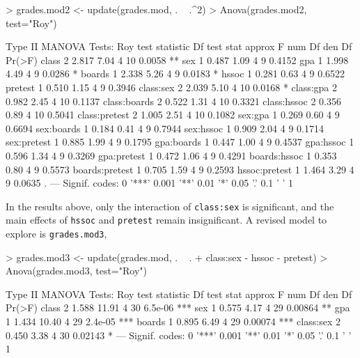 \documentclass[11pt]{article}
\newcommand{\code}[1]{{\texttt{#1}}}
\begin{document}
\begin{Schunk}
\begin{Sinput}
> grades.mod2 <- update(grades.mod, . ~ .^2)
> Anova(grades.mod2, test="Roy")
\end{Sinput}
\begin{Soutput}
Type II MANOVA Tests: Roy test statistic
               Df test stat approx F num Df den Df Pr(>F)   
class           2     2.817     7.04      4     10 0.0058 **
sex             1     0.487     1.09      4      9 0.4152   
gpa             1     1.998     4.49      4      9 0.0286 * 
boards          1     2.338     5.26      4      9 0.0183 * 
hssoc           1     0.281     0.63      4      9 0.6522   
pretest         1     0.510     1.15      4      9 0.3946   
class:sex       2     2.039     5.10      4     10 0.0168 * 
class:gpa       2     0.982     2.45      4     10 0.1137   
class:boards    2     0.522     1.31      4     10 0.3321   
class:hssoc     2     0.356     0.89      4     10 0.5041   
class:pretest   2     1.005     2.51      4     10 0.1082   
sex:gpa         1     0.269     0.60      4      9 0.6694   
sex:boards      1     0.184     0.41      4      9 0.7944   
sex:hssoc       1     0.909     2.04      4      9 0.1714   
sex:pretest     1     0.885     1.99      4      9 0.1795   
gpa:boards      1     0.447     1.00      4      9 0.4537   
gpa:hssoc       1     0.596     1.34      4      9 0.3269   
gpa:pretest     1     0.472     1.06      4      9 0.4291   
boards:hssoc    1     0.353     0.80      4      9 0.5573   
boards:pretest  1     0.705     1.59      4      9 0.2593   
hssoc:pretest   1     1.464     3.29      4      9 0.0635 . 
---
Signif. codes:  0 '***' 0.001 '**' 0.01 '*' 0.05 '.' 0.1 ' ' 1 
\end{Soutput}
\end{Schunk}
In the results above, only the interaction of \code{class:sex} is significant,
and the main effects of \code{hssoc} and \code{pretest} remain insignificant.
A revised model to explore is \code{grades.mod3},

\begin{Schunk}
\begin{Sinput}
> grades.mod3 <- update(grades.mod, . ~ . + class:sex - hssoc - pretest)
> Anova(grades.mod3, test="Roy")
\end{Sinput}
\begin{Soutput}
Type II MANOVA Tests: Roy test statistic
          Df test stat approx F num Df den Df  Pr(>F)    
class      2     1.588    11.91      4     30 6.5e-06 ***
sex        1     0.575     4.17      4     29 0.00864 ** 
gpa        1     1.434    10.40      4     29 2.4e-05 ***
boards     1     0.895     6.49      4     29 0.00074 ***
class:sex  2     0.450     3.38      4     30 0.02143 *  
---
Signif. codes:  0 '***' 0.001 '**' 0.01 '*' 0.05 '.' 0.1 ' ' 1 
\end{Soutput}
\end{Schunk}
\end{document}
